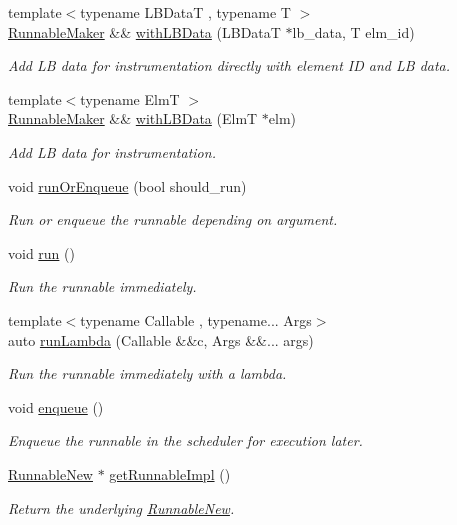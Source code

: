 \begin{DoxyCompactItemize}
{\footnotesize template$<$typename L\+B\+DataT , typename T $>$ }\\\hyperlink{structvt_1_1runnable_1_1_runnable_maker}{Runnable\+Maker} \&\& \hyperlink{structvt_1_1runnable_1_1_runnable_maker_af44e0061ec3a17b27dfbc64e60d1fcef}{with\+L\+B\+Data} (L\+B\+DataT $\ast$lb\+\_\+data, T elm\+\_\+id)
\begin{DoxyCompactList}\small\item\em Add LB data for instrumentation directly with element ID and LB data. \end{DoxyCompactList}\item 
{\footnotesize template$<$typename ElmT $>$ }\\\hyperlink{structvt_1_1runnable_1_1_runnable_maker}{Runnable\+Maker} \&\& \hyperlink{structvt_1_1runnable_1_1_runnable_maker_a14daf2e1c58f498590974fa97c22c61a}{with\+L\+B\+Data} (ElmT $\ast$elm)
\begin{DoxyCompactList}\small\item\em Add LB data for instrumentation. \end{DoxyCompactList}\item 
void \hyperlink{structvt_1_1runnable_1_1_runnable_maker_aa0ae94d80e43385c18ee1e2afbce59a2}{run\+Or\+Enqueue} (bool should\+\_\+run)
\begin{DoxyCompactList}\small\item\em Run or enqueue the runnable depending on argument. \end{DoxyCompactList}\item 
void \hyperlink{structvt_1_1runnable_1_1_runnable_maker_a8fb3e1362dd6f746e991786654f5bd40}{run} ()
\begin{DoxyCompactList}\small\item\em Run the runnable immediately. \end{DoxyCompactList}\item 
{\footnotesize template$<$typename Callable , typename... Args$>$ }\\auto \hyperlink{structvt_1_1runnable_1_1_runnable_maker_a7f36cd1bb5c957840dfbe108fc1983f6}{run\+Lambda} (Callable \&\&c, Args \&\&... args)
\begin{DoxyCompactList}\small\item\em Run the runnable immediately with a lambda. \end{DoxyCompactList}\item 
void \hyperlink{structvt_1_1runnable_1_1_runnable_maker_a76516d824c744bdd347806012a78e19b}{enqueue} ()
\begin{DoxyCompactList}\small\item\em Enqueue the runnable in the scheduler for execution later. \end{DoxyCompactList}\item 
\hyperlink{structvt_1_1runnable_1_1_runnable_new}{Runnable\+New} $\ast$ \hyperlink{structvt_1_1runnable_1_1_runnable_maker_accd2b512108a1ac1e686bc25791c2e5f}{get\+Runnable\+Impl} ()
\begin{DoxyCompactList}\small\item\em Return the underlying {\ttfamily \hyperlink{structvt_1_1runnable_1_1_runnable_new}{Runnable\+New}}. \end{DoxyCompactList}\end{DoxyCompactItemize}
